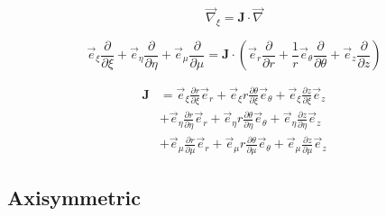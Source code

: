 \documentclass[times,namecite]{goose-article}
\begin{document}


\begin{equation}
  \vec{\nabla}_\xi = \bm{J} \cdot \vec{\nabla}
\end{equation}

\begin{equation}
  \vec{e}_\xi  \frac{\partial}{\partial \xi }  +
  \vec{e}_\eta \frac{\partial}{\partial \eta} +
  \vec{e}_\mu  \frac{\partial}{\partial \mu}
  =
  \bm{J} \cdot
  \left(
              \vec{e}_r      \frac{\partial}{\partial r     } +
  \frac{1}{r} \vec{e}_\theta \frac{\partial}{\partial \theta} +
              \vec{e}_z      \frac{\partial}{\partial z     }
  \right)
\end{equation}

\begin{align}
  \bm{J}
  &=
  \vec{e}_\xi    \frac{\partial r     }{\partial \xi } \vec{e}_r      +
  \vec{e}_\xi  r \frac{\partial \theta}{\partial \xi } \vec{e}_\theta +
  \vec{e}_\xi    \frac{\partial z     }{\partial \xi } \vec{e}_z
  \nonumber
  \\
  &+
  \vec{e}_\eta   \frac{\partial r     }{\partial \eta} \vec{e}_r      +
  \vec{e}_\eta r \frac{\partial \theta}{\partial \eta} \vec{e}_\theta +
  \vec{e}_\eta   \frac{\partial z     }{\partial \eta} \vec{e}_z
  \nonumber
  \\
  &+
  \vec{e}_\mu    \frac{\partial r     }{\partial \mu } \vec{e}_r      +
  \vec{e}_\mu  r \frac{\partial \theta}{\partial \mu } \vec{e}_\theta +
  \vec{e}_\mu    \frac{\partial z     }{\partial \mu } \vec{e}_z
\end{align}

\subsection{Axisymmetric}

% 
\end{document}
